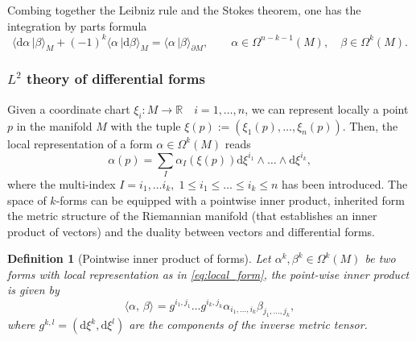 \documentclass{elsarticle}
\newtheorem{definition}{Definition}
\renewcommand\d{\ensuremath{\mathrm{d}}}
\newcommand{\bbR}{\mathbb{R}}
\newcommand{\inpr}[3][]{\ensuremath{\langle #2, \, #3 \rangle_{#1}}}
\newcommand{\dualpr}[3][]{\ensuremath{\langle #2 \, \vert #3 \rangle_{#1}}}
\begin{document}
Combing together the Leibniz rule and the Stokes theorem, one has the integration by parts formula 
\begin{equation}
    \dualpr[M]{\d\alpha}{\beta} + (-1)^k \dualpr[M]{\alpha}{\d\beta} = \dualpr[\partial M]{\alpha}{\beta}, \qquad \alpha \in \Omega^{n-k-1}(M), \quad \beta \in \Omega^k(M).
\end{equation}


\subsubsection{$L^2$ theory of differential forms}
Given a coordinate chart $\xi_i:M \rightarrow \bbR \quad i=1, \dots,n$,
we can represent locally a point $p$ in the manifold $M$ with the tuple 
$\xi(p) := (\xi_1(p), \dots, \xi_n(p))$.
Then, the local representation of a form $\alpha \in \Omega^k(M)$ reads
\begin{equation}\label{eq:local_form}
    \alpha(p) = \sum_I \alpha_I(\xi(p)) \d\xi^{i_1} \wedge \dots \wedge \d\xi^{i_k},
\end{equation}
where the multi-index $I= i_1, \dots i_k, \; 1 \le i_1 \le \dots \le i_k \le n$ has been introduced. The space of $k$-forms can be equipped with a pointwise inner product, inherited form the metric structure of the Riemannian manifold (that establishes an inner product of vectors) and the duality between vectors and differential forms. 

\begin{definition}[Pointwise inner product of forms]\label{eq:local_inpr}
Let $\alpha^k, \beta^k \in \Omega^k(M)$ be two forms with local representation as in \eqref{eq:local_form}, the point-wise inner product is given by
\begin{equation}
    \inpr{\alpha}{\beta} = g^{i_1, j_1} \dots g^{i_k, j_k} \alpha_{i_1, \dots, i_k} \beta_{j_1, \dots, j_k},
\end{equation}
where $g^{k, l} = (\d\xi^k, \d\xi^l)$ are the components of the inverse metric tensor.
\end{definition}
\end{document}
